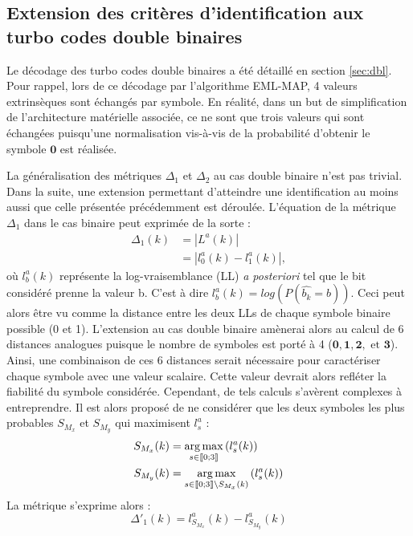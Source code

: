\subsection{Extension des critères d'identification aux turbo codes double binaires}
Le décodage des turbo codes double binaires a été détaillé en section \ref{sec:dbl}. Pour rappel, lors de ce décodage par
l'algorithme EML-MAP, 4 valeurs extrinsèques sont échangés par symbole. En réalité, dans un but de simplification de 
l'architecture matérielle associée, ce ne sont que trois valeurs qui sont échangées puisqu'une normalisation vis-à-vis de 
la probabilité d'obtenir le symbole $\mathbf{0}$ est réalisée. 

La généralisation des métriques $\Delta_1$ et $\Delta_2$ au cas double binaire n'est pas trivial. Dans la suite, une 
extension permettant d'atteindre une identification au moins aussi que celle présentée précédemment est déroulée.
L'équation de la métrique $\Delta_1$ dans le cas binaire peut exprimée de la sorte : 
\begin{align*}
\Delta_1(k) &= |L^a(k)|\\
			&= |l^a_0(k)-l^a_1(k)|,
\end{align*}
où $l^a_b(k)$ représente la log-vraisemblance (LL) \textit{a posteriori} tel que le bit considéré prenne la valeur b. C'est à dire
$l^a_b(k) = log\left(P(\hat{b_k} = b)\right)$. Ceci peut alors être vu comme la distance entre les deux LLs de chaque symbole
binaire possible (0 et 1). L'extension au cas double binaire amènerai alors au calcul de 6 distances analogues puisque le
nombre de symboles est porté à 4 ($\mathbf{0}, \mathbf{1}, \mathbf{2}, \text{~et~} \mathbf{3}$). Ainsi, une combinaison 
de ces 6 distances serait nécessaire pour caractériser chaque symbole avec une valeur scalaire. Cette valeur devrait alors 
refléter la fiabilité du symbole considérée. Cependant, de tels calculs s'avèrent complexes à entreprendre. Il est alors 
proposé de ne considérer que les deux symboles les plus probables $S_{M_x}$ et $S_{M_y}$ qui maximisent $l^a_s$ :
\begin{align*}
S_{M_x}(k) &= \operatorname*{arg\,max}\limits_{s\in\llbracket0;3\rrbracket}\left(l^a_s(k)\right) \\
S_{M_y}(k) &= \operatorname*{arg\,max}\limits_{s\in\llbracket0;3\rrbracket\setminus{S_{M_x}(k)}}\left(l^a_s(k)\right)
\end{align*}
La métrique s'exprime alors :
\begin{equation}
	\Delta'_1(k) = l^a_{S_{M_x}}(k)-l^a_{S_{M_y}}(k)
\end{equation}


